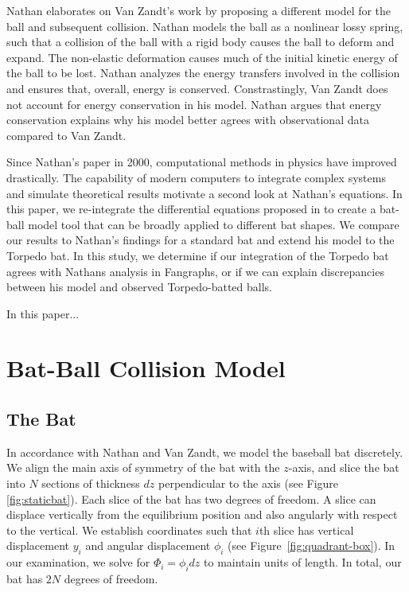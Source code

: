 \documentclass[linenumbers]{aastex7}
\begin{document}
Nathan elaborates on Van Zandt's work by proposing a different model for the ball and subsequent collision. Nathan models the ball as a nonlinear lossy spring, such that a collision of the ball with a rigid body causes the ball to deform and expand. The non-elastic deformation causes much of the initial kinetic energy of the ball to be lost. Nathan analyzes the energy transfers involved in the collision and ensures that, overall, energy is conserved. Constrastingly, Van Zandt does not account for energy conservation in his model. Nathan argues that energy conservation explains why his model better agrees with observational data compared to Van Zandt.


Since Nathan's paper in 2000, computational methods in physics have improved drastically. The capability of modern computers to integrate complex systems and simulate theoretical results motivate a second look at Nathan's equations. In this paper, we re-integrate the differential equations proposed in \citet{nathanDynamicsBaseballBat2000a} to create a bat-ball model tool that can be broadly applied to different bat shapes. We compare our results to Nathan's findings for a standard bat and extend his model to the Torpedo bat. In this study, we determine if our integration of the Torpedo bat agrees with Nathans analysis in Fangraphs, or if we can explain discrepancies between his model and observed Torpedo-batted balls. 


In this paper...
\section{Bat-Ball Collision Model}
\subsection{The Bat}
In accordance with Nathan and Van Zandt, we model the baseball bat discretely. We align the main axis of symmetry of the bat with the $z$-axis, and slice the bat into $N$ sections of thickness $dz$ perpendicular to the axis (see Figure \ref{fig:staticbat}). Each slice of the bat has two degrees of freedom. A slice can displace vertically from the equilibrium position and also angularly with respect to the vertical. We establish coordinates such that $i$th slice has vertical displacement $y_i$ and angular displacement $\phi_i$ (see Figure~\ref{fig:quadrant-box}). In our examination, we solve for $\Phi_i = \phi_i dz$ to maintain units of length. In total, our bat has $2N$ degrees of freedom.
\end{document}
